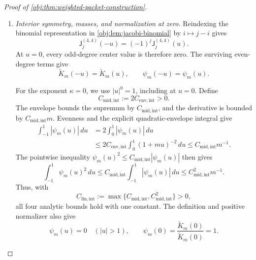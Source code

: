 \documentclass[11pt]{article}
\begin{document}
\begin{proof}[Proof of \cref{obj:thm:weighted-packet-construction}]
\begin{enumerate}
On the whole line,
\[
\psi_m(u)
=
\mathcal T(u)\frac{\widetilde K_m(u)}{\widetilde K_m(0)}.
\]
The previously established regularity of \(\mathcal T\) proves that this packet is continuously differentiable. Its derivative vanishes outside \([-1,1]\), and continuity extends the bound to the two endpoints.

Set
\[
C_{\mathrm{env,int}}
:=
\frac{C_{\mathrm{loc},2}^{4,4}
      +8C_{\mathrm{loc},1}^{4,4}
      +C_{\mathrm{lip},1}^{4,4}}{c_{\mathrm{int}}}>0.
\]
We have proved, for every real \(u\),
\[
|\psi_m(u)|\le C_{\mathrm{env,int}}(1+m|u|)^{-2},
\qquad
|\psi_m'(u)|\le C_{\mathrm{env,int}}m.
\]

\item \emph{Interior symmetry, masses, and normalization at zero.}
Reindexing the binomial representation in \cref{obj:lem:jacobi-binomial} by \(i\mapsto j-i\) gives
\[
\mathsf J_j^{(4,4)}(-u)
=(-1)^j\mathsf J_j^{(4,4)}(u).
\]
At \(u=0\), every odd-degree center value is therefore zero. The surviving even-degree terms give
\[
\widetilde K_m(-u)=\widetilde K_m(u),
\qquad
\psi_m(-u)=\psi_m(u).
\]

For the exponent \(\kappa=0\), we use \(|u|^0=1\), including at \(u=0\). Define
\[
C_{\mathrm{mid,int}}:=2C_{\mathrm{env,int}}>0.
\]
The envelope bounds the supremum by \(C_{\mathrm{mid,int}}\), and the derivative is bounded by \(C_{\mathrm{mid,int}}m\). Evenness and the explicit quadratic-envelope integral give
\[
\begin{split}
\int_{-1}^1|\psi_m(u)|\,du
&=
2\int_0^1|\psi_m(u)|\,du\\
&\le
2C_{\mathrm{env,int}}\int_0^1(1+mu)^{-2}\,du
\le C_{\mathrm{mid,int}}m^{-1}.
\end{split}
\]
The pointwise inequality
\(\psi_m(u)^2\le C_{\mathrm{mid,int}}|\psi_m(u)|\) then gives
\[
\int_{-1}^1\psi_m(u)^2\,du
\le
C_{\mathrm{mid,int}}\int_{-1}^1|\psi_m(u)|\,du
\le C_{\mathrm{mid,int}}^2m^{-1}.
\]
Thus, with
\[
C_{\mathrm{fin,int}}
:=
\max\{C_{\mathrm{mid,int}},C_{\mathrm{mid,int}}^2\}>0,
\]
all four analytic bounds hold with one constant. The definition and positive normalizer also give
\[
\psi_m(u)=0\quad(|u|>1),
\qquad
\psi_m(0)=\frac{\widetilde K_m(0)}{\widetilde K_m(0)}=1.
\]


\end{enumerate}
\end{proof}
\end{document}
